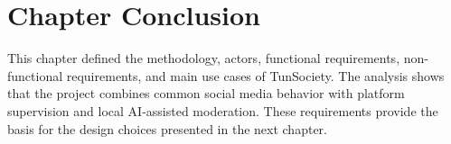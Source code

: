 \section{Chapter Conclusion}

This chapter defined the methodology, actors, functional requirements, non-functional requirements, and main use cases of TunSociety. The analysis shows that the project combines common social media behavior with platform supervision and local AI-assisted moderation. These requirements provide the basis for the design choices presented in the next chapter.
